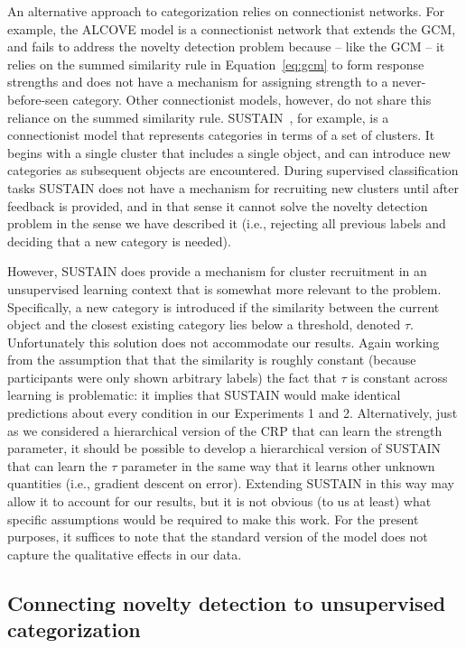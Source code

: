 \documentclass[doc]{apa6}
\begin{document}
An alternative approach to categorization relies on connectionist networks. For example, the ALCOVE model \cite{kruschke_alcove:_1992} is a connectionist network that extends the GCM, and fails to address the novelty detection problem because -- like the GCM -- it relies on the summed similarity rule in Equation~\ref{eq:gcm} to form response strengths and does not have a mechanism for assigning strength to a never-before-seen category. Other connectionist models, however, do not share this reliance on the summed similarity rule. SUSTAIN~\cite{love_sustain:_2004}, for example, is a connectionist model that represents categories in terms of a set of clusters. It begins with a single cluster that includes a single object, and can introduce new categories as subsequent objects are encountered. During supervised classification tasks SUSTAIN does not have a mechanism for recruiting new clusters until after feedback is provided, and in that sense it cannot solve the novelty detection problem in the sense we have described it (i.e., rejecting all previous labels and deciding that a new category is needed).

However, SUSTAIN does provide a mechanism for cluster recruitment in an unsupervised learning context that is somewhat more relevant to the problem. Specifically, a new category is introduced if the similarity between the current object and the closest existing category lies below a threshold, denoted $\tau$. Unfortunately this solution does not accommodate our results. Again working from the assumption that that the similarity is roughly constant (because participants were only shown arbitrary labels) the fact that $\tau$ is constant across learning is problematic: it implies that SUSTAIN would make identical predictions about every condition in our Experiments 1 and 2. Alternatively, just as we considered a hierarchical version of the CRP that can learn the strength parameter, it should be possible to develop a hierarchical version of SUSTAIN that can learn the $\tau$ parameter in the same way that it learns other unknown quantities (i.e., gradient descent on error). Extending SUSTAIN in this way may allow it to account for our results, but it is not obvious (to us at least) what specific assumptions would be required to make this work. For the present purposes, it suffices to note that the standard version of the model does not capture the qualitative effects in our data.


\subsection{Connecting novelty detection to unsupervised categorization}
\end{document}

